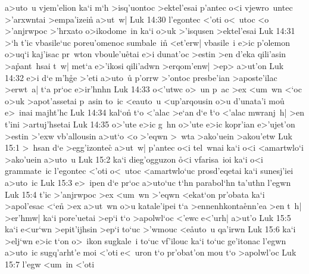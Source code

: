 a>uto~u
vjem'elion
ka`i
m`h
>isq'uontoc
>ektel'esai
p'antec
o<i
vjewro~untec
>'arxwntai
>empa'izein\r{}
a>ut~w|\bibvsend
\vs Luk 14:30
l'egontec
<'oti
o<~utoc
<o
>'anjrwpoc
>'hrxato
o>ikodome~in
ka`i
o>uk
>'isqusen
>ektel'esai\bibvsend
\vs Luk 14:31
>`h
t'ic
vbasile`uc
poreu'omenoc
sumbale~in\r{}
<et'erw|
vbasile~i
e>ic
p'olemon
o>uq`i
kaj'isac
pr~wton
vboule'u\r{e}tai
e>i
dunat'oc
>estin
>en
d'eka
qili'asin
>a\r{p}ant~hsai
t~w|
met`a
e>'ikosi
qili'adwn
>erqom'enw|
>ep>
a>ut'on\bibvsend
\vs Luk 14:32
e>i
d`e
m'h\r{g}e
>'eti
a>uto~u\r{}
p'orrw
>'ontoc
presbe'ian
>aposte'ilac
>erwt~a|
t`a
pr`oc
e>ir'hnhn\bibvsend
\vs Luk 14:33
o<'utwc
o>~un
p~ac
>ex
<um~wn
<`oc
o>uk
>apot'assetai
p~asin
to~ic
<eauto~u
<up'arqousin
o>u
d'unata'i
mou\r{}
e>~inai
majht'hc\bibvsend
\vs Luk 14:34
kal`o\r{n}
t`o
<'alac
>e`an
d`e
\r{t}`o
<'alac
mwranj~h|
>en
t'ini
>artuj'hsetai\bibvsend
\vs Luk 14:35
o>'ute
e>ic
g~hn
o>'ute
e>ic
kopr'ian
e>'ujet'on
>estin
>'exw
vb'allousin
a>ut`o
<o
>'eqwn
>~wta
>ako'uein
>akou'etw\bibvsend
\vs Luk 15:1
>~hsan
d`e
>egg'izontec\r{}
a>ut~w|
p'antec
o<i
tel~wnai
ka`i
o<i
<amartwlo`i
>ako'uein
a>uto~u\bibvsend
\vs Luk 15:2
ka`i
dieg'ogguzon
\r{o}<i
vfarisa~ioi
ka`i
o<i
grammate~ic
l'egontec
<'oti
o<~utoc
<amartwlo`uc
prosd'eqetai
ka`i
sunesj'iei
a>uto~ic\bibvsend
\vs Luk 15:3
e>~ipen
d`e
pr`oc
a>uto`uc
t`hn
parabol`hn
ta'uthn
l'egwn\bibvsend
\vs Luk 15:4
t'ic
>'anjrwpoc
>ex
<um~wn
>'eqwn
<ekat`on
pr'obata
ka`i
>apol'esac
<`en\r{}
>ex
a>ut~wn
o>u
katale'ipei
t`a
>ennenhkonta\r{e}nn'ea
>en
t~h|
>er'hmw|
ka`i
pore'uetai
>ep`i
t`o
>apolwl`oc
<'ewc
e<'urh|
a>ut'o\bibvsend
\vs Luk 15:5
ka`i
e<ur`wn
>epit'ijhsin
>ep`i
to`uc
>'wmouc
<e\r{a}uto~u
qa'irwn\bibvsend
\vs Luk 15:6
ka`i
>elj`wn
e>ic
t`on
o>~ikon
sugkale~i
to`uc
vf'ilouc
ka`i
to`uc
ge'itonac
l'egwn
a>uto~ic
sugq'arht'e
moi
<'oti
e<~uron
t`o
pr'obat'on
mou
t`o
>apolwl'oc\bibvsend
\vs Luk 15:7
l'egw
<um~in
<'oti
